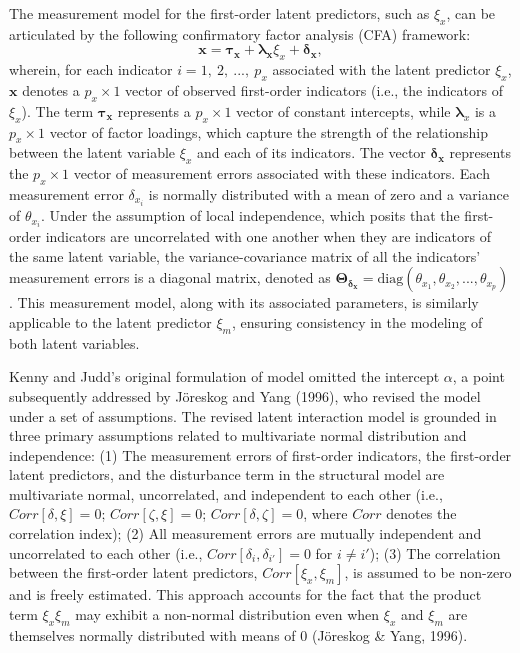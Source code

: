 \documentclass[
  man,mask]{apa6}
\begin{document}
The measurement model for the first-order latent predictors, such as \(\xi_{x}\), can be articulated by the following confirmatory factor analysis (CFA) framework:
\begin{equation}
\mathbf{x} = \boldsymbol{\tau_{x}} + \boldsymbol{\lambda_{x}}\xi_{x} + \boldsymbol{\delta_{x}},
\end{equation}
wherein, for each indicator \(i = 1, \ 2, \ ..., \ p_{x}\) associated with the latent predictor \(\xi_{x}\), \(\mathbf{x}\) denotes a \(p_{x} \times 1\) vector of observed first-order indicators (i.e., the indicators of \(\xi_{x}\)). The term \(\boldsymbol{\tau_{x}}\) represents a \(p_{x} \times 1\) vector of constant intercepts, while \(\boldsymbol{\lambda}_{x}\) is a \(p_{x} \times 1\) vector of factor loadings, which capture the strength of the relationship between the latent variable \(\xi_{x}\) and each of its indicators. The vector \(\boldsymbol{\delta_{x}}\) represents the \(p_{x} \times 1\) vector of measurement errors associated with these indicators. Each measurement error \(\delta_{x_{i}}\) is normally distributed with a mean of zero and a variance of \(\theta_{x_{i}}\). Under the assumption of local independence, which posits that the first-order indicators are uncorrelated with one another when they are indicators of the same latent variable, the variance-covariance matrix of all the indicators' measurement errors is a diagonal matrix, denoted as \(\mathbf{\Theta_{\delta_{x}}} = \text{diag}(\theta_{x_{1}}, \theta_{x_{2}}, ..., \theta_{x_{p}})\). This measurement model, along with its associated parameters, is similarly applicable to the latent predictor \(\xi_{m}\), ensuring consistency in the modeling of both latent variables.

Kenny and Judd's original formulation of model omitted the intercept \(\alpha\), a point subsequently addressed by Jöreskog and Yang (1996), who revised the model under a set of assumptions. The revised latent interaction model is grounded in three primary assumptions related to multivariate normal distribution and independence: (1) The measurement errors of first-order indicators, the first-order latent predictors, and the disturbance term in the structural model are multivariate normal, uncorrelated, and independent to each other (i.e., \(Corr[\delta, \xi] = 0\); \(Corr[\zeta, \xi] = 0\); \(Corr[\delta, \zeta] = 0\), where \(Corr\) denotes the correlation index); (2) All measurement errors are mutually independent and uncorrelated to each other (i.e., \(Corr[\delta_{i}, \delta_{i'}] = 0\) for \(i \neq i'\)); (3) The correlation between the first-order latent predictors, \(Corr[\xi_{x}, \xi_{m}]\), is assumed to be non-zero and is freely estimated. This approach accounts for the fact that the product term \(\xi_{x}\xi_{m}\) may exhibit a non-normal distribution even when \(\xi_{x}\) and \(\xi_{m}\) are themselves normally distributed with means of 0 (Jöreskog \& Yang, 1996).
\end{document}
